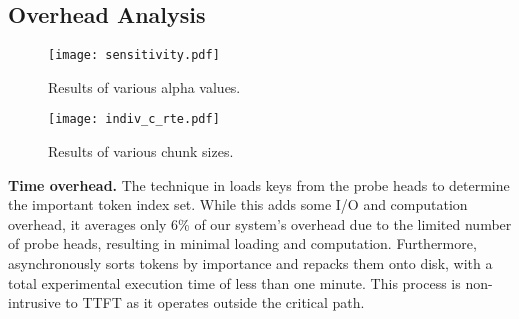 \subsection{Overhead Analysis}
\label{exp:overhead}

\begin{figure}
	\centering
	\begin{minipage}{1.6in}
		\texttt{[image: sensitivity.pdf]}
		\caption{
			Results of various alpha values.
		}
		\label{fig:sensitivity_alpha}
	\end{minipage}
	\hspace{0.04in}
	\begin{minipage}{1.6in}
		\centering
		\texttt{[image: indiv\_c\_rte.pdf]}
		\caption{
			Results of various chunk sizes.
		}
		\label{fig:sens_ck}
	\end{minipage} 
	\vspace{-0.15in}
\end{figure}

\noindent \textbf{Time overhead.} 
The \techa{} technique in \pname{} loads keys from the probe heads to determine the important token index set. While this adds some I/O and computation overhead, it averages only 6\% of our system's overhead due to the limited number of probe heads, resulting in minimal loading and computation.
Furthermore, \techba{} asynchronously sorts tokens by importance and repacks them onto disk, with a total experimental execution time of less than one minute. This process is non-intrusive to TTFT as it operates outside the critical path.

